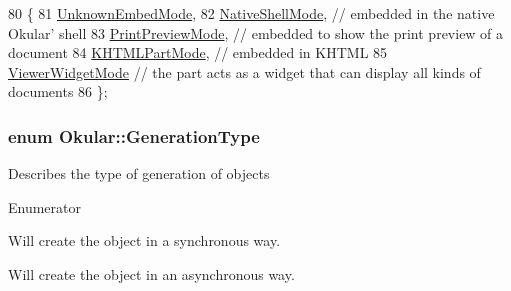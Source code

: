 \begin{DoxyCode}
80 \{
81     \hyperlink{namespaceOkular_adbe21e337d65d3f5f07a441180428ba8a3bb7ac1cc6c88ffdec148c8d6c53a811}{UnknownEmbedMode},
82     \hyperlink{namespaceOkular_adbe21e337d65d3f5f07a441180428ba8ae06451e28dfb108642b1c3a61a196145}{NativeShellMode},         \textcolor{comment}{// embedded in the native Okular' shell}
83     \hyperlink{namespaceOkular_adbe21e337d65d3f5f07a441180428ba8a3c886e44dadfdb624559818a85d90b94}{PrintPreviewMode},        \textcolor{comment}{// embedded to show the print preview of a document}
84     \hyperlink{namespaceOkular_adbe21e337d65d3f5f07a441180428ba8a22dac18ba4f0fded006c596dfe03ce04}{KHTMLPartMode},           \textcolor{comment}{// embedded in KHTML}
85     \hyperlink{namespaceOkular_adbe21e337d65d3f5f07a441180428ba8aebaf7bae8bd4303bad7c4ca29057c472}{ViewerWidgetMode}         \textcolor{comment}{// the part acts as a widget that can display all kinds of
       documents}
86 \};
\end{DoxyCode}
\hypertarget{namespaceOkular_aefe2f23519d73b489219060219986007}{
\subsubsection[{Generation\+Type}]{\setlength{\rightskip}{0pt plus 5cm}enum {\bf Okular\+::\+Generation\+Type}}}\label{namespaceOkular_aefe2f23519d73b489219060219986007}
Describes the type of generation of objects \begin{Desc}
\item[Enumerator]\par
\begin{description}
\item[{\em 
\hypertarget{namespaceOkular_aefe2f23519d73b489219060219986007a90d229125a62906242e5b3f5c8923d67}{Synchronous}\label{namespaceOkular_aefe2f23519d73b489219060219986007a90d229125a62906242e5b3f5c8923d67}
}]Will create the object in a synchronous way. \item[{\em 
\hypertarget{namespaceOkular_aefe2f23519d73b489219060219986007a1e713842b8b248fff46f11354a58cb67}{Asynchronous}\label{namespaceOkular_aefe2f23519d73b489219060219986007a1e713842b8b248fff46f11354a58cb67}
}]Will create the object in an asynchronous way. \end{description}
\end{Desc}


